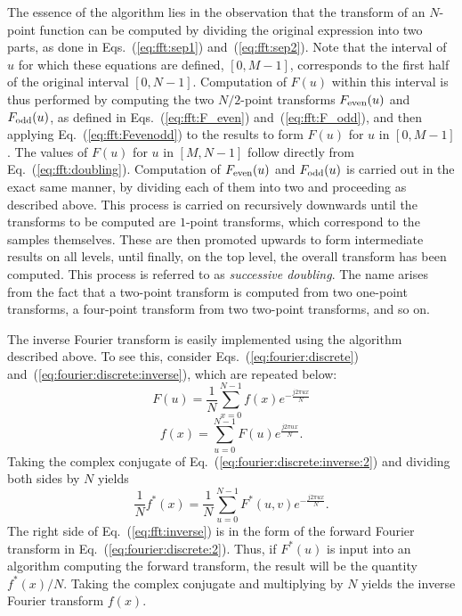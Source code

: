 The essence of the {\fft} algorithm lies in the observation that the
transform of an $N$-point function can be computed by dividing the
original expression into two parts, as done in
Eqs.~(\ref{eq:fft:sep1}) and~(\ref{eq:fft:sep2}).  Note that the
interval of $u$ for which these equations are defined, $[0,M-1]$,
corresponds to the first half of the original interval $[0,N-1]$.
Computation of $F(u)$ within this interval is thus performed by
computing the two $N/2$-point transforms $F_{\mbox{\scriptsize even}}(u)$ and
$F_{\mbox{\scriptsize odd}}(u)$, as defined in Eqs.~(\ref{eq:fft:F_even})
and~(\ref{eq:fft:F_odd}), and then applying
Eq.~(\ref{eq:fft:Fevenodd}) to the results to form $F(u)$ for $u$ in
$[0,M-1]$.  The values of $F(u)$ for $u$ in $[M,N-1]$ follow directly
from Eq.~(\ref{eq:fft:doubling}).  Computation of $F_{\mbox{\scriptsize even}}(u)$ and
$F_{\mbox{\scriptsize odd}}(u)$ is carried out in the exact same manner, by dividing
each of them into two and proceeding as described above.  This process
is carried on recursively downwards until the transforms to be
computed are $1$-point transforms, which correspond to the samples
themselves.  These are then promoted upwards to form intermediate
results on all levels, until finally, on the top level, the overall
transform has been computed.  This process is referred to as {\em
  successive doubling\/}.  The name arises from the fact that a
two-point transform is computed from two one-point transforms, a
four-point transform from two two-point transforms, and so on.

The inverse Fourier transform is easily implemented using the {\fft}
algorithm described above.  To see this, consider
Eqs.~(\ref{eq:fourier:discrete})
and~(\ref{eq:fourier:discrete:inverse}), which are repeated below:
\begin{equation}
\label{eq:fourier:discrete:2}
  F(u)=\frac{1}{N}\sum_{x=0}^{N-1}f(x)e^{-\frac{j2\pi ux}{N}}
\end{equation}
\begin{equation}
\label{eq:fourier:discrete:inverse:2}
  f(x)=\sum_{u=0}^{N-1}F(u)e^{\frac{j2\pi ux}{N}}\mbox{.}
\end{equation}
Taking the complex conjugate of
Eq.~(\ref{eq:fourier:discrete:inverse:2}) and dividing both sides by
$N$ yields
\begin{equation}
\label{eq:fft:inverse}
  \frac{1}{N}f^{\ast}(x)=\frac{1}{N}\sum_{u=0}^{N-1}F^{\ast}(u,v)
  e^{-\frac{j2\pi ux}{N}}\mbox{.}
\end{equation}
The right side of Eq.~(\ref{eq:fft:inverse}) is in the form of the
forward Fourier transform in Eq.~(\ref{eq:fourier:discrete:2}).  Thus,
if $F^{\ast}(u)$ is input into an algorithm computing the forward
transform, the result will be the quantity $f^{\ast}(x)/N$.  Taking
the complex conjugate and multiplying by $N$ yields the inverse
Fourier transform $f(x)$.

